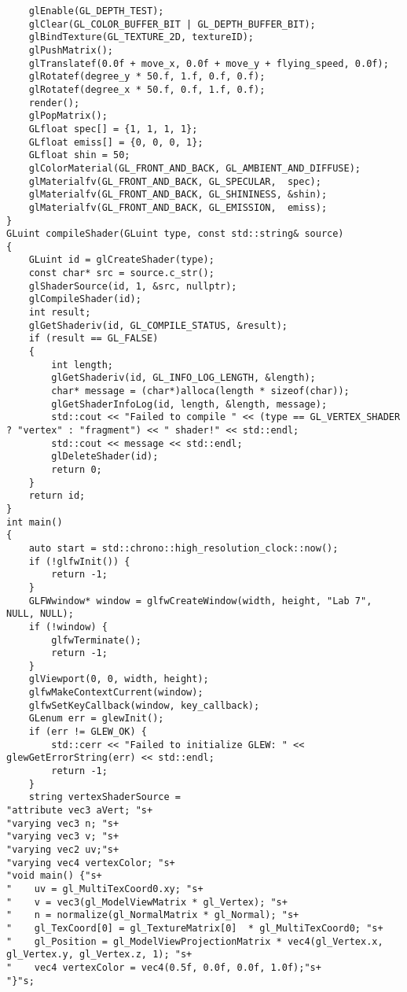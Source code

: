 \documentclass[a4paper, 14pt]{extarticle}
\begin{document}
\begin{verbatim}
    glEnable(GL_DEPTH_TEST);
    glClear(GL_COLOR_BUFFER_BIT | GL_DEPTH_BUFFER_BIT);
    glBindTexture(GL_TEXTURE_2D, textureID);
    glPushMatrix();
    glTranslatef(0.0f + move_x, 0.0f + move_y + flying_speed, 0.0f);
    glRotatef(degree_y * 50.f, 1.f, 0.f, 0.f);
    glRotatef(degree_x * 50.f, 0.f, 1.f, 0.f);
    render();
    glPopMatrix();
    GLfloat spec[] = {1, 1, 1, 1};
    GLfloat emiss[] = {0, 0, 0, 1};
    GLfloat shin = 50;
    glColorMaterial(GL_FRONT_AND_BACK, GL_AMBIENT_AND_DIFFUSE);
    glMaterialfv(GL_FRONT_AND_BACK, GL_SPECULAR,  spec);
    glMaterialfv(GL_FRONT_AND_BACK, GL_SHININESS, &shin);
    glMaterialfv(GL_FRONT_AND_BACK, GL_EMISSION,  emiss);
}
GLuint compileShader(GLuint type, const std::string& source)
{
    GLuint id = glCreateShader(type);
    const char* src = source.c_str();
    glShaderSource(id, 1, &src, nullptr);
    glCompileShader(id);
    int result;
    glGetShaderiv(id, GL_COMPILE_STATUS, &result);
    if (result == GL_FALSE)
    {
        int length;
        glGetShaderiv(id, GL_INFO_LOG_LENGTH, &length);
        char* message = (char*)alloca(length * sizeof(char));
        glGetShaderInfoLog(id, length, &length, message);
        std::cout << "Failed to compile " << (type == GL_VERTEX_SHADER ? "vertex" : "fragment") << " shader!" << std::endl;
        std::cout << message << std::endl;
        glDeleteShader(id);
        return 0;
    }
    return id;
}
int main()
{
    auto start = std::chrono::high_resolution_clock::now();
    if (!glfwInit()) {
        return -1;
    }
    GLFWwindow* window = glfwCreateWindow(width, height, "Lab 7", NULL, NULL);
    if (!window) {
        glfwTerminate();
        return -1;
    }
    glViewport(0, 0, width, height);
    glfwMakeContextCurrent(window);
    glfwSetKeyCallback(window, key_callback);
    GLenum err = glewInit();
    if (err != GLEW_OK) {
        std::cerr << "Failed to initialize GLEW: " << glewGetErrorString(err) << std::endl;
        return -1;
    }
    string vertexShaderSource =
"attribute vec3 aVert; "s+
"varying vec3 n; "s+
"varying vec3 v; "s+
"varying vec2 uv;"s+
"varying vec4 vertexColor; "s+
"void main() {"s+
"    uv = gl_MultiTexCoord0.xy; "s+
"    v = vec3(gl_ModelViewMatrix * gl_Vertex); "s+
"    n = normalize(gl_NormalMatrix * gl_Normal); "s+
"    gl_TexCoord[0] = gl_TextureMatrix[0]  * gl_MultiTexCoord0; "s+
"    gl_Position = gl_ModelViewProjectionMatrix * vec4(gl_Vertex.x, gl_Vertex.y, gl_Vertex.z, 1); "s+
"    vec4 vertexColor = vec4(0.5f, 0.0f, 0.0f, 1.0f);"s+
"}"s;


\end{verbatim}
\end{document}
